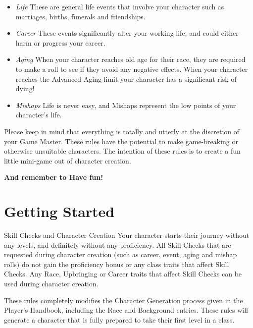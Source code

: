 \documentclass[10pt,twoside]{article}
\begin{document}
\begin{multicols}{2}
\begin{itemize}
\begin{itemize}
\item \textit{Life} These are general life events that involve your character such as marriages, births, funerals and friendships.
\item \textit{Career} These events significantly alter your working life, and could either harm or progress your career.
\item \textit{Aging} When your character reaches old age for their race, they are required to make a roll to see if they avoid any negative effects. When your character reaches the Advanced Aging limit your character has a significant risk of dying!
\item \textit{Mishaps} Life is never easy, and Mishaps represent the low points of your character's life.
\end{itemize}
\end{itemize}

Please keep in mind that everything is totally and utterly at the discretion of your Game Master. These rules have the potential to make game-breaking or otherwise unsuitable characters. The intention of these rules is to create a fun little mini-game out of character creation.

\textbf{And remember to Have fun!}

\section{Getting Started}

\begin{paperbox}{Skill Checks and Character Creation}
Your character starts their journey without any levels, and definitely without any proficiency. All Skill Checks that are requested during character creation (such as career, event, aging and mishap rolls) do not gain the proficiency bonus or any class traits that affect Skill Checks.
Any Race, Upbringing or Career traits that affect Skill Checks can be used during character creation.
\end{paperbox}

These rules completely modifies the Character Generation process given in the Player's Handbook, including the Race and Background entries. These rules will generate a character that is fully prepared to take their first level in a class.


\end{multicols}
\end{document}
